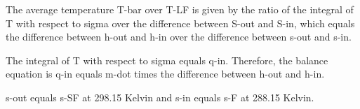 The average temperature T-bar over T-LF is given by the ratio of the integral of T with respect to sigma over the difference between S-out and S-in, which equals the difference between h-out and h-in over the difference between s-out and s-in.

The integral of T with respect to sigma equals q-in. Therefore, the balance equation is q-in equals m-dot times the difference between h-out and h-in.

s-out equals s-SF at 298.15 Kelvin and s-in equals s-F at 288.15 Kelvin.